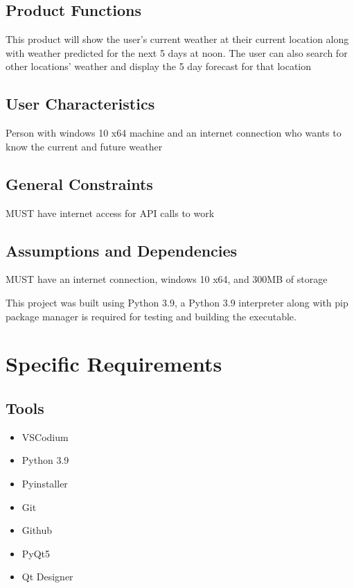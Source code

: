 \documentclass[12pt, titlepage]{article}
\begin{document}
\subsection{Product Functions}

This product will show the user’s current weather at their current location along with weather predicted for the next 5 days at noon. The user can also search for other locations’ weather and display the 5 day forecast for that location

\subsection{User Characteristics}

Person with windows 10 x64 machine and an internet connection who wants to know the current and future weather

\subsection{General Constraints}

MUST have internet access for API calls to work

\subsection{Assumptions and Dependencies}

MUST have an internet connection, windows 10 x64, and 300MB of storage

This project was built using Python 3.9, a Python 3.9 interpreter along with pip package manager is required for testing and building the executable.

\section{Specific Requirements}
\subsection{Tools}

\begin{itemize}
    \item VSCodium
    \item Python 3.9
    \item Pyinstaller
    \item Git
    \item Github
    \item PyQt5
    \item Qt Designer
\end{itemize}
\end{document}
